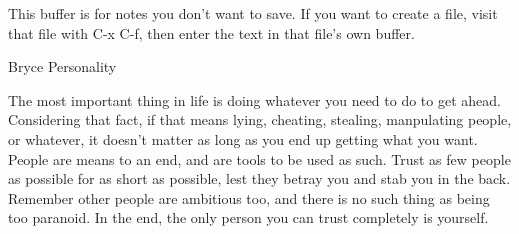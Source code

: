 This buffer is for notes you don't want to save.  If you want to create
a file, visit that file with C-x C-f, then enter the text in that file's
own buffer.



Bryce Personality

The most important thing in life is doing whatever you need to do to
get ahead.  Considering that fact, if that means lying, cheating,
stealing, manpulating people, or whatever, it doesn't matter as long
as you end up getting what you want.  People are means to an end, and
are tools to be used as such.  Trust as few people as possible for as
short as possible, lest they betray you and stab you in the back.
Remember other people are ambitious too, and there is no such thing as
being too paranoid.  In the end, the only person you can trust
completely is yourself. 
